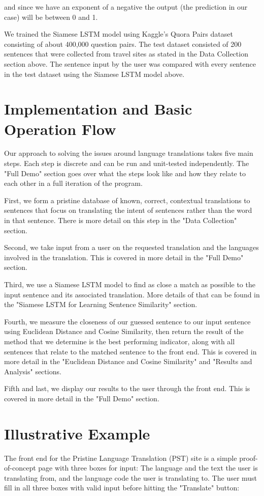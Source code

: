 \documentclass[runningheads]{llncs}
\begin{document}
	and since we have an exponent of a negative the output (the prediction in our case) will be between 0 and 1.
	
	We trained the Siamese  LSTM model using Kaggle's Quora Pairs dataset~\cite{ref_url25} consisting of about 400,000 question pairs. The test dataset consisted of 200 sentences that were collected from travel sites as stated in the Data Collection section above. The sentence input by the user was compared with every sentence in the test dataset using the Siamese LSTM model above.

	\section{Implementation and Basic Operation Flow}
	Our approach to solving the issues around language translations takes five main steps. Each step is discrete and can be run and unit-tested independently. The "Full Demo" section goes over what the steps look like and how they relate to each other in a full iteration of the program. 

	First, we form a pristine database of known, correct, contextual translations to sentences that focus on translating the intent of sentences rather than the word in that sentence. There is more detail on this step in the "Data Collection" section. 

	Second, we take input from a user on the requested translation and the languages involved in the translation. This is covered in more detail in the "Full Demo" section. 

	Third, we use a Siamese LSTM model to find as close a match as possible to the input sentence and its associated translation.  More details of that can be found in the "Siamese LSTM for Learning Sentence Similarity" section. 

	Fourth, we measure the closeness of our guessed sentence to our input sentence using Euclidean Distance and Cosine Similarity, then return the result of the method that we determine is the best performing indicator, along with all sentences that relate to the matched sentence to the front end. This is covered in more detail in the "Euclidean Distance and Cosine Similarity" and "Results and Analysis" sections.

	Fifth and last, we display our results to the user through the front end. This is covered in more detail in the "Full Demo" section.
	
	
	\section{Illustrative Example}
	The front end for the Pristine Language Translation (PST) site is a simple proof-of-concept page with three boxes for input: The language and the text the user is translating from, and the language code the user is translating to. The user must fill in all three boxes with valid input before hitting the "Translate" button:
\end{document}
